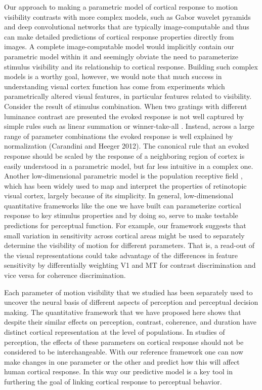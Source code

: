 Our approach to making a parametric model of cortical response to motion visibility contrasts with more complex models, such as Gabor wavelet pyramids and deep convolutional networks \citep{Kay2008-mj,Kay2017-bj,Yamins2014-rm} that are typically image-computable and thus can make detailed predictions of cortical response properties directly from images. A complete image-computable model would implicitly contain our parametric model within it and seemingly obviate the need to parameterize stimulus visibility and its relationship to cortical response. Building such complex models is a worthy goal, however, we would note that much success in understanding visual cortex function has come from experiments which parametrically altered visual features, in particular features related to visibility. Consider the result of stimulus combination. When two gratings with different luminance contrast are presented the evoked response is not well captured by simple rules such as linear summation or winner-take-all \citep{Busse2009-pt}. Instead, across a large range of parameter combinations the evoked response is well explained by normalization (Carandini and Heeger 2012). The canonical rule that an evoked response should be scaled by the response of a neighboring region of cortex is easily understood in a parametric model, but far less intuitive in a complex one. Another low-dimensional parametric model is the population receptive field \citep{Dumoulin2008-uc,Wandell2015-uv}, which has been widely used to map and interpret the properties of retinotopic visual cortex, largely because of its simplicity. In general, low-dimensional quantitative frameworks like the one we have built can parameterize cortical response to key stimulus properties and by doing so, serve to make testable predictions for perceptual function. For example, our framework suggests that small variation in sensitivity across cortical areas might be used to separately determine the visibility of motion for different parameters. That is, a read-out of the visual representations could take advantage of the differences in feature sensitivity by differentially weighting V1 and MT for contrast discrimination and vice versa for coherence discrimination.

Each parameter of motion visibility that we studied has been separately used to uncover the neural basis of different aspects of perception and perceptual decision making. The quantitative framework that we have proposed here shows that despite their similar effects on perception, contrast, coherence, and duration have distinct cortical representation at the level of populations. In studies of perception, the effects of these parameters on cortical response should not be considered to be interchangeable. With our reference framework one can now make changes in one parameter or the other and predict how this will affect human cortical response. In this way our predictive model is a key tool in furthering the goal of linking cortical response to perceptual behavior.

